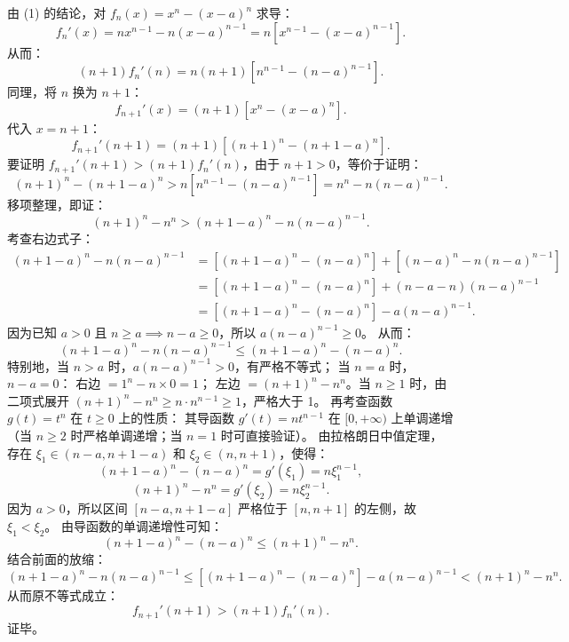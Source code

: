 \begin{answer}
由 (1) 的结论，对 $f_n(x) = x^n - (x - a)^n$ 求导：
\nopagebreak[4]
\[f_n'(x) = n x^{n-1} - n(x - a)^{n-1} = n [x^{n-1} - (x - a)^{n-1}].\]
从而：
\nopagebreak[4]
\[(n + 1) f_n'(n) = n(n + 1) [n^{n-1} - (n - a)^{n-1}].\]
同理，将 $n$ 换为 $n + 1$：
\nopagebreak[4]
\[f_{n+1}'(x) = (n + 1) [x^n - (x - a)^n].\]
代入 $x = n + 1$：
\nopagebreak[4]
\[f_{n+1}'(n + 1) = (n + 1) [(n + 1)^n - (n + 1 - a)^n].\]
要证明 $f_{n+1}'(n + 1) > (n + 1) f_n'(n)$，由于 $n + 1 > 0$，等价于证明：
\nopagebreak[4]
\[(n + 1)^n - (n + 1 - a)^n > n [n^{n-1} - (n - a)^{n-1}] = n^n - n(n - a)^{n-1}.\]
移项整理，即证：
\nopagebreak[4]
\[(n + 1)^n - n^n > (n + 1 - a)^n - n(n - a)^{n-1}.\]
考查右边式子：
\nopagebreak[4]
\[\begin{aligned}
(n + 1 - a)^n - n(n - a)^{n-1} &= [(n + 1 - a)^n - (n - a)^n] + [(n - a)^n - n(n - a)^{n-1}] \\
&= [(n + 1 - a)^n - (n - a)^n] + (n - a - n)(n - a)^{n-1} \\
&= [(n + 1 - a)^n - (n - a)^n] - a(n - a)^{n-1}.
\end{aligned}\]
因为已知 $a > 0$ 且 $n \ge a \implies n - a \ge 0$，所以 $a(n - a)^{n-1} \ge 0$。
从而：
\nopagebreak[4]
\[(n + 1 - a)^n - n(n - a)^{n-1} \le (n + 1 - a)^n - (n - a)^n.\]
特别地，当 $n > a$ 时，$a(n - a)^{n-1} > 0$，有严格不等式；
当 $n = a$ 时，$n - a = 0$：
右边 $= 1^n - n \times 0 = 1$；
左边 $= (n + 1)^n - n^n$。当 $n \ge 1$ 时，由二项式展开 $(n + 1)^n - n^n \ge n \cdot n^{n-1} \ge 1$，严格大于 1。
再考查函数 $g(t) = t^n$ 在 $t \ge 0$ 上的性质：
其导函数 $g'(t) = n t^{n-1}$ 在 $[0, +\infty)$ 上单调递增（当 $n \ge 2$ 时严格单调递增；当 $n = 1$ 时可直接验证）。
由拉格朗日中值定理，存在 $\xi_1 \in (n - a, n + 1 - a)$ 和 $\xi_2 \in (n, n + 1)$，使得：
\nopagebreak[4]
\[(n + 1 - a)^n - (n - a)^n = g'(\xi_1) = n \xi_1^{n-1},\]
\nopagebreak[4]
\[(n + 1)^n - n^n = g'(\xi_2) = n \xi_2^{n-1}.\]
因为 $a > 0$，所以区间 $[n - a, n + 1 - a]$ 严格位于 $[n, n + 1]$ 的左侧，故 $\xi_1 < \xi_2$。
由导函数的单调递增性可知：
\nopagebreak[4]
\[(n + 1 - a)^n - (n - a)^n \le (n + 1)^n - n^n.\]
结合前面的放缩：
\nopagebreak[4]
\[(n + 1 - a)^n - n(n - a)^{n-1} \le [(n + 1 - a)^n - (n - a)^n] - a(n - a)^{n-1} < (n + 1)^n - n^n.\]
从而原不等式成立：
\nopagebreak[4]
\[f_{n+1}'(n + 1) > (n + 1) f_n'(n).\]
证毕。



\end{answer}